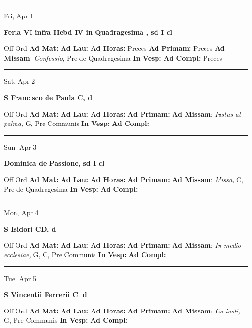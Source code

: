 \documentclass[letterpaper, 10pt]{article}
\begin{document}
\hrule
\begin{center}
Fri, Apr 1
\end{center}\textbf{ \large Feria VI infra Hebd IV in Quadragesima , \textnormal{\normalsize sd I cl}}
\begin{justify}
Off Ord
\textbf{Ad Mat: }
\textbf{Ad Lau: }
\textbf{Ad Horas: }Preces
\textbf{Ad Primam: }Preces
\textbf{Ad Missam}: \textit{Confessio,} Pre de Quadragesima
\textbf{In Vesp: }
\textbf{Ad Compl: }Preces\end{justify}



\hrule
\begin{center}
Sat, Apr 2
\end{center}\textbf{ \large S Francisco de Paula C, \textnormal{\normalsize d}}
\begin{justify}
Off Ord
\textbf{Ad Mat: }
\textbf{Ad Lau: }
\textbf{Ad Horas: }
\textbf{Ad Primam: }
\textbf{Ad Missam}: \textit{Iustus ut palma,} G, Pre Communis
\textbf{In Vesp: }
\textbf{Ad Compl: }\end{justify}



\hrule
\begin{center}
Sun, Apr 3
\end{center}\textbf{ \large Dominica de Passione, \textnormal{\normalsize sd I cl}}
\begin{justify}
Off Ord
\textbf{Ad Mat: }
\textbf{Ad Lau: }
\textbf{Ad Horas: }
\textbf{Ad Primam: }
\textbf{Ad Missam}: \textit{Missa,} C, Pre de Quadragesima
\textbf{In Vesp: }
\textbf{Ad Compl: }\end{justify}



\hrule
\begin{center}
Mon, Apr 4
\end{center}\textbf{ \large S Isidori CD, \textnormal{\normalsize d}}
\begin{justify}
Off Ord
\textbf{Ad Mat: }
\textbf{Ad Lau: }
\textbf{Ad Horas: }
\textbf{Ad Primam: }
\textbf{Ad Missam}: \textit{In medio ecclesiae,} G, C, Pre Communis
\textbf{In Vesp: }
\textbf{Ad Compl: }\end{justify}



\hrule
\begin{center}
Tue, Apr 5
\end{center}\textbf{ \large S Vincentii Ferrerii C, \textnormal{\normalsize d}}
\begin{justify}
Off Ord
\textbf{Ad Mat: }
\textbf{Ad Lau: }
\textbf{Ad Horas: }
\textbf{Ad Primam: }
\textbf{Ad Missam}: \textit{Os iusti,} G, Pre Communis
\textbf{In Vesp: }
\textbf{Ad Compl: }\end{justify}
\end{document}
